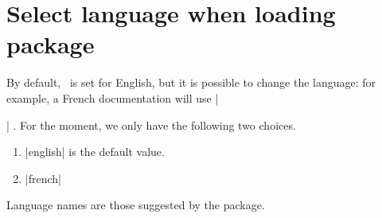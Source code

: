 \documentclass[10pt, a4paper]{article}
\begin{document}
\section{Select language when loading package}

By default, \thispack\ is set for English, but it is possible to change the language: for example, a French documentation will use \tdocinlatex|\usepackage[lang = french]{tutodoc}| .
For the moment, we only have the following two choices.

\begin{enumerate}
    \item \tdocinlatex|english| is the default value.

    \item \tdocinlatex|french|
\end{enumerate}


\begin{tdocnote}
    Language names are those suggested by the  package.
\end{tdocnote}
\end{document}
